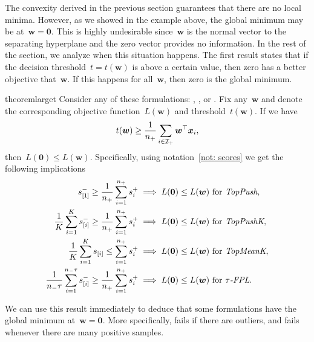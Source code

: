The convexity derived in the previous section guarantees that there are no local minima. However, as we showed in the example above, the global minimum may be at~$\bm{w} = \bm{0}$. This is highly undesirable since~$\bm{w}$ is the normal vector to the separating hyperplane and the zero vector provides no information. In the rest of the section, we analyze when this situation happens. The first result states that if the decision threshold~$t = t(\bm{w})$ is above a certain value, then zero has a better objective that~$\bm{w}$. If this happens for all~$\bm{w}$, then zero is the global minimum.
\begin{restatable}{theorem}{larget}\label{thm:large_t}
  Consider any of these formulations: \TopPush, \TopPushK, \TopMeanK or \tauFPL. Fix any~$\bm{w}$ and denote the corresponding objective function~$L(\bm{w})$ and threshold~$t(\bm{w})$. If we have
  \begin{equation}\label{eq:w_zero_nn}
    t(\bm{w})\geq \frac{1}{n_{+}} \sum_{i \in \mathcal{I}_{+}} \bm{w}^{\top} \bm{x}_i,
  \end{equation}
  then~$L(\bm{0}) \leq L(\bm{w})$. Specifically, using notation~\ref{not: scores} we get the following implications
  \begin{equation}\label{eq:w_zero}
    \begin{aligned}
    s_{[1]}^- \geq \frac{1}{n_{+}} \sum_{i=1}^{n_{+}} s_{i}^+
      & \implies L(\bm{0}) \leq L(\bm{w}) \text{ for } \emph{TopPush}, \\
    \frac{1}{K}\sum_{i=1}^K s_{[i]}^- \geq \frac{1}{n_{+}} \sum_{i=1}^{n_{+}} s_{i}^+
      & \implies L(\bm{0}) \leq L(\bm{w}) \text{ for } \emph{TopPushK}, \\
    \frac{1}{K} \sum_{i=1}^{K} s_{[i]} \leq \sum_{i=1}^{n_{+}} s_{i}^+
      & \implies L(\bm{0}) \leq L(\bm{w}) \text{ for } \emph{TopMeanK}, \\
    \frac{1}{n_{-}\tau} \sum_{i=1}^{n_{-}\tau} s_{[i]}^- \geq \frac{1}{n_{+}}\sum_{i=1}^{n_{+}} s_{i}^+
      & \implies L(\bm{0}) \leq L(\bm{w}) \text{ for } {\emph{$\tau$-FPL}}. \\
    \end{aligned}
  \end{equation}
\end{restatable}

\noindent We can use this result immediately to deduce that some formulations have the global minimum at~$\bm{w} = \bm{0}$. More specifically, \TopPush fails if there are outliers, and \TopMeanK fails whenever there are many positive samples.

